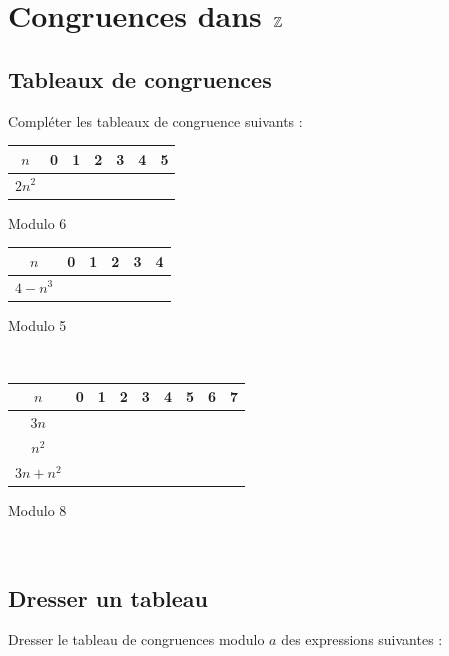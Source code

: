 \documentclass[oneside,12pt]{book}          %
\begin{document}
\section{Congruences dans ${\mathbb Z}$}

\subsection{Tableaux de congruences}
Compléter les tableaux de congruence suivants :
    
    \begin{minipage}{0.5\textwidth}
    \setlength{\tabcolsep}{15pt}
        \begin{tabular}{|c|c|c|c|c|c|c|} \hline
        $n$&0&1&2&3&4&5 \\ \hline
        $2n^2$& & & & & & \\ \hline
      \end{tabular}
      
      \smallskip
      \centering \small Modulo 6
    \end{minipage}
    \begin{minipage}{0.5\textwidth}
    \setlength{\tabcolsep}{15pt}
        \begin{tabular}{|c|c|c|c|c|c|} \hline
        $n$&0&1&2&3&4 \\ \hline
        $4-n^3$& & & & & \\ \hline
      \end{tabular}
      
      \smallskip
      \centering \small Modulo 5
    \end{minipage}\\[15pt]

    \begin{minipage}{\textwidth}
    \setlength{\tabcolsep}{24pt}
        \begin{tabular}{|c|c|c|c|c|c|c|c|c|} \hline
        $n$&0&1&2&3&4&5&6&7 \\ \hline
        $3n$& & & & & & & & \\ \hline
        $n^2$& & & & & & & & \\ \hline
        $3n+n^2$& & & & & & & & \\ \hline
      \end{tabular}
      
      \smallskip
      \centering \small Modulo 8
    \end{minipage}\\[5pt]



\subsection{Dresser un tableau}
Dresser le tableau de congruences modulo $a$ des expressions suivantes :
\end{document}
